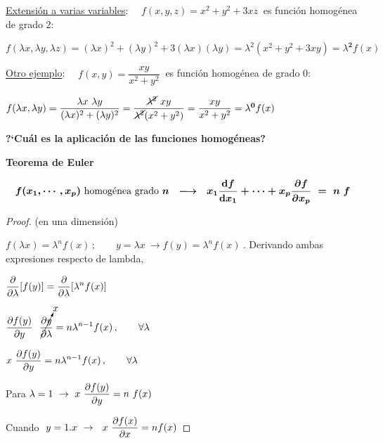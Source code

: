 \underline{Extensión a varias variables}: $\quad f(x,y,z)=x^2+y^2+3xz\ $  es función homogénea de grado 2:

$f(\lambda x,\lambda y, \lambda z)=(\lambda x)^2+(\lambda y)^2 +3(\lambda x)(\lambda y)=\lambda^2 (x^2+y^2+3xy)=\lambda^{\boldsymbol{2}} f(x)$

\underline{Otro ejemplo}: $\quad f(x,y)=\dfrac{xy}{x^2+y^2}\ $ es función homogénea de grado 0:

$f(\lambda x,\lambda y)=\dfrac{\lambda x \ \lambda y}{(\lambda x)^2+(\lambda y)^2}= \dfrac{\cancel{\lambda ^2} \ xy}{\cancel{\lambda^2} (x^2+y^2)}=\dfrac{xy}{x^2+y^2}=\lambda^{\boldsymbol{0}} f(x)$

\vspace{5mm}
\textbf{?`Cuál es la aplicación de las funciones homogéneas?}

\begin{theorem}

\textbf{Teorema de Euler}

\begin{equation}
\label{T12ThEuler}
\boldsymbol{
f(x_1,\cdots ,x_p) \text{ homogénea grado } n \ \ \longrightarrow \ \ 
x_1\dv{f}{x_1} + \cdots + x_p\pdv{f}{x_p} \ = \ n \ f
}	
\end{equation}	
\end{theorem}

\begin{proof} (en una dimensión)

$f(\lambda x)=\lambda^n f(x)\, ; \qquad y=\lambda x \ \to f(y)=\lambda ^n f(x)\ $. Derivando ambas expresiones respecto de lambda,

\hspace{2cm} $\displaystyle \pdv{\lambda} [f(y)] = \pdv{\lambda} [\lambda^n f(x) ] $

\hspace{2cm} $\displaystyle \pdv{f(y)}{y} \ \  \cancelto{x}{\pdv{y}{\lambda}} = n \lambda^{n-1} f(x)\, , \qquad \forall \lambda$

\hspace{2cm} $\displaystyle x \ \pdv{f(y)}{y} = n \lambda^{n-1} f(x) \, , \qquad \forall \lambda$

\hspace{2cm} Para $\lambda=1 \ \to \ \displaystyle x \ \pdv{f(y)}{y} = n \ f(x)$

\hspace{2cm} Cuando $\ y=1.x \ \to \ \ \displaystyle x \ \pdv{f(x)}{x} = n f(x)$
\end{proof}



